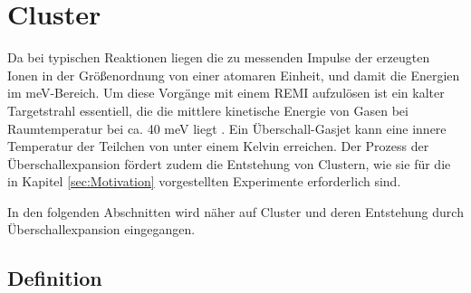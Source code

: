 \newpage
\section{Cluster} \label{sec:Cluster}

Da bei typischen Reaktionen liegen die zu messenden Impulse der erzeugten Ionen in der Größenordnung von einer atomaren Einheit, und damit die Energien im meV-Bereich. Um diese Vorgänge mit einem REMI aufzulösen ist ein kalter Targetstrahl essentiell, die die mittlere kinetische Energie von Gasen bei Raumtemperatur bei ca. 40 meV liegt \cite{kurka07}. Ein Überschall-Gasjet kann eine innere Temperatur der Teilchen von unter einem Kelvin erreichen. Der Prozess der Überschallexpansion fördert zudem die Entstehung von Clustern, wie sie für die in Kapitel \ref{sec:Motivation} vorgestellten Experimente erforderlich sind.

In den folgenden Abschnitten wird näher auf Cluster und deren Entstehung durch Überschallexpansion eingegangen.


\subsection{Definition}

